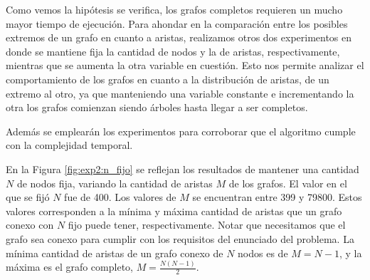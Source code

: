     \begin{figure}[H]
        \centering
        \caption{}
        \label{fig:exp2:comparacion}
    \end{figure}

    Como vemos la hipótesis se verifica, los grafos completos requieren un mucho mayor tiempo de ejecución. Para ahondar en la comparación entre los posibles extremos de un grafo en cuanto a aristas, realizamos otros dos experimentos en donde se mantiene fija la cantidad de nodos y la de aristas, respectivamente, mientras que se aumenta la otra variable en cuestión. Esto nos permite analizar el comportamiento de los grafos en cuanto a la distribución de aristas, de un extremo al otro, ya que manteniendo una variable constante e incrementando la otra los grafos comienzan siendo árboles hasta llegar a ser completos.

    Además se emplearán los experimentos para corroborar que el algoritmo cumple con la complejidad temporal.

    \renewcommand\constante{10}

    En la Figura \ref{fig:exp2:n_fijo} se reflejan los resultados de mantener una cantidad $N$ de nodos fija, variando la cantidad de aristas $M$ de los grafos. El valor en el que se fijó $N$ fue de 400. Los valores de $M$ se encuentran entre 399 y 79800. Estos valores corresponden a la mínima y máxima cantidad de aristas que un grafo conexo con $N$ fijo puede tener, respectivamente. Notar que necesitamos que el grafo sea conexo para cumplir con los requisitos del enunciado del problema. La mínima cantidad de aristas de un grafo conexo de $N$ nodos es de $M = N - 1$, y la máxima es el grafo completo, $M = \frac{N(N - 1)}{2}$.

